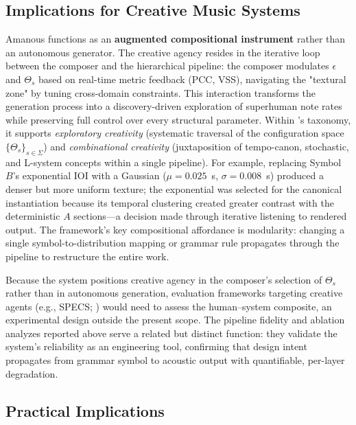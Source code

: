 \documentclass[a4paper]{article}
\theoremstyle{definition}
\theoremstyle{remark}
\begin{document}
\subsection{Implications for Creative Music Systems}
\label{sec:creativity}

Amanous functions as an \textbf{augmented compositional instrument} rather than an autonomous generator. The creative agency resides in the iterative loop between the composer and the hierarchical pipeline: the composer modulates $\epsilon$ and $\Theta_s$ based on real-time metric feedback (PCC, VSS), navigating the "textural zone" by tuning cross-domain constraints. This interaction transforms the generation process into a discovery-driven exploration of superhuman note rates while preserving full control over every structural parameter. Within \citet{boden2004creative}'s taxonomy, it supports \emph{exploratory creativity} (systematic traversal of the configuration space $\{\Theta_s\}_{s \in \Sigma}$) and \emph{combinational creativity} (juxtaposition of tempo-canon, stochastic, and L-system concepts within a single pipeline). For example, replacing Symbol~$B$'s exponential IOI with a Gaussian ($\mu = 0.025$~s, $\sigma = 0.008$~s) produced a denser but more uniform texture; the exponential was selected for the canonical instantiation because its temporal clustering created greater contrast with the deterministic $A$ sections---a decision made through iterative listening to rendered output. The framework's key compositional affordance is modularity: changing a single symbol-to-distribution mapping or grammar rule propagates through the pipeline to restructure the entire work.

Because the system positions creative agency in the composer's selection of $\Theta_s$ rather than in autonomous generation, evaluation frameworks targeting creative agents (e.g., SPECS; \citealp{jordanous2012standardised}) would need to assess the human--system composite, an experimental design outside the present scope. The pipeline fidelity and ablation analyzes reported above serve a related but distinct function: they validate the system's reliability as an engineering tool, confirming that design intent propagates from grammar symbol to acoustic output with quantifiable, per-layer degradation.

\subsection{Practical Implications}
\end{document}
